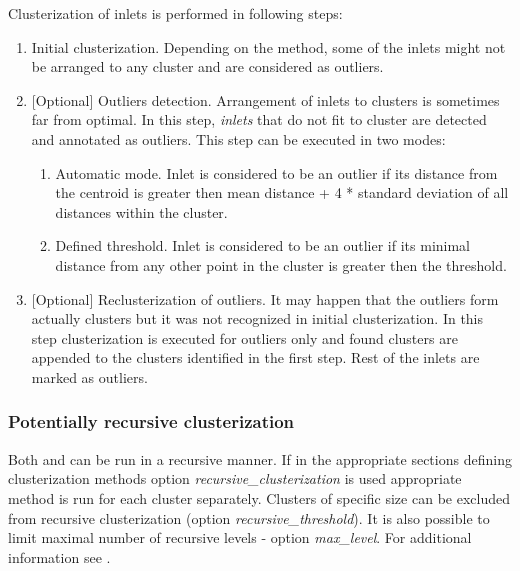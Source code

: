 \documentclass[a4paper,10pt,english]{sphinxmanual}
\begin{document}
Clusterization of inlets is performed in following steps:
\begin{enumerate}
\item {} 
Initial clusterization. Depending on the method, some of the inlets might not be arranged to any cluster and are considered as outliers.

\item {} 
{[}Optional{]} Outliers detection. Arrangement of inlets to clusters is sometimes far from optimal. In this step, \emph{inlets} that do not fit to cluster are detected and annotated as outliers. This step can be executed in two modes:
\begin{enumerate}
\item {} 
Automatic mode. Inlet is considered to be an outlier if its distance from the centroid is greater then mean distance + 4 * standard deviation of all distances within the cluster.

\item {} 
Defined threshold. Inlet is considered to be an outlier if its minimal distance from any other point in the cluster is greater then the threshold.

\end{enumerate}

\item {} 
{[}Optional{]} Reclusterization of outliers. It may happen that the outliers form actually clusters but it was not recognized in initial clusterization. In this step clusterization is executed for outliers only and found clusters are appended to the clusters identified in the first step. Rest of the inlets are marked as outliers.

\end{enumerate}


\subsubsection{Potentially recursive clusterization}
\label{valve/valve_manual:potentially-recursive-clusterization}
Both  and  can be run in a recursive manner. If in the appropriate sections defining clusterization methods option \emph{recursive\_clusterization} is used appropriate method is run for each cluster separately. Clusters of specific size can be excluded from recursive clusterization (option \emph{recursive\_threshold}). It is also possible to limit maximal number of recursive levels - option \emph{max\_level}. For additional information see {\hyperref[valve/valve_config:clusterization\string-options]{}}.
\end{document}

